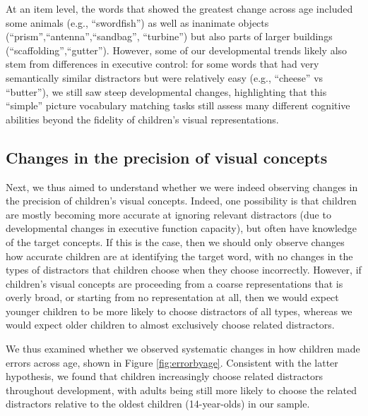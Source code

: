 \documentclass[
  man,floatsintext]{apa6}
\begin{document}
At an item level, the words that showed the greatest change across age included some animals (e.g., ``swordfish'') as well as inanimate objects (``prism'',``antenna'',``sandbag'', ``turbine'') but also parts of larger buildings (``scaffolding'',``gutter''). However, some of our developmental trends likely also stem from differences in executive control: for some words that had very semantically similar distractors but were relatively easy (e.g., ``cheese'' vs ``butter''), we still saw steep developmental changes, highlighting that this ``simple'' picture vocabulary matching tasks still assess many different cognitive abilities beyond the fidelity of children's visual representations.

\subsection{Changes in the precision of visual concepts}\label{changes-in-the-precision-of-visual-concepts}

Next, we thus aimed to understand whether we were indeed observing changes in the precision of children's visual concepts. Indeed, one possibility is that children are mostly becoming more accurate at ignoring relevant distractors (due to developmental changes in executive function capacity), but often have knowledge of the target concepts. If this is the case, then we should only observe changes how accurate children are at identifying the target word, with no changes in the types of distractors that children choose when they choose incorrectly. However, if children's visual concepts are proceeding from a coarse representations that is overly broad, or starting from no representation at all, then we would expect younger children to be more likely to choose distractors of all types, whereas we would expect older children to almost exclusively choose related distractors.

We thus examined whether we observed systematic changes in how children made errors across age, shown in Figure \ref{fig:errorbyage}. Consistent with the latter hypothesis, we found that children increasingly choose related distractors throughout development, with adults being still more likely to choose the related distractors relative to the oldest children (14-year-olds) in our sample.
\end{document}
